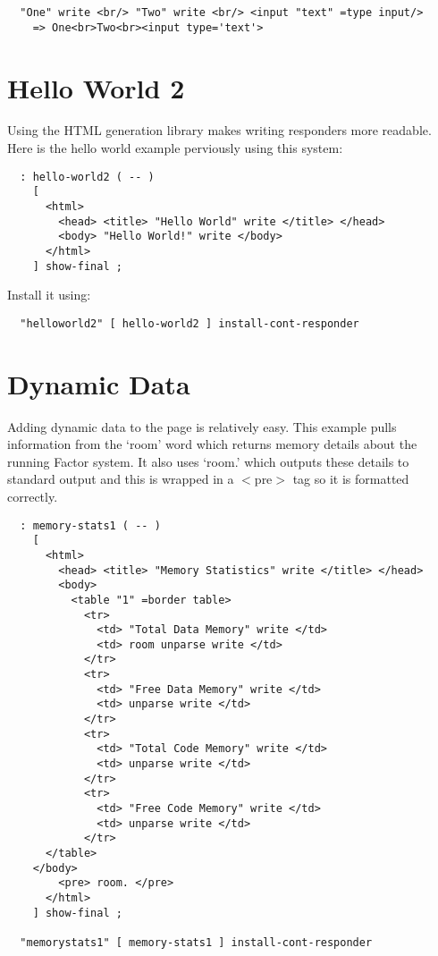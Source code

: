 \begin{verbatim}
  "One" write <br/> "Two" write <br/> <input "text" =type input/>
    => One<br>Two<br><input type='text'>
\end{verbatim}

\section{Hello World 2}


Using the HTML generation library makes writing responders more
readable. Here is the hello world example perviously using this
system:

\begin{verbatim}
  : hello-world2 ( -- )
    [
      <html>
        <head> <title> "Hello World" write </title> </head>
        <body> "Hello World!" write </body>
      </html>
    ] show-final ;
\end{verbatim}

Install it using:

\begin{verbatim}
  "helloworld2" [ hello-world2 ] install-cont-responder
\end{verbatim}

\section{Dynamic Data}

Adding dynamic data to the page is relatively easy. This example pulls
information from the `room' word which returns memory details about
the running Factor system. It also uses `room.' which outputs these
details to standard output and this is wrapped in a $<$pre$>$ tag so it is
formatted correctly.

\begin{verbatim}
  : memory-stats1 ( -- )
    [
      <html>
        <head> <title> "Memory Statistics" write </title> </head>
        <body>
          <table "1" =border table>
            <tr> 
              <td> "Total Data Memory" write </td>
              <td> room unparse write </td>
            </tr>
            <tr> 
              <td> "Free Data Memory" write </td>
              <td> unparse write </td>
            </tr>
            <tr> 
              <td> "Total Code Memory" write </td>
              <td> unparse write </td>
            </tr>
            <tr> 
              <td> "Free Code Memory" write </td>
              <td> unparse write </td>
            </tr>
	  </table>
	</body>
        <pre> room. </pre>
      </html>
    ] show-final ;
    
  "memorystats1" [ memory-stats1 ] install-cont-responder
\end{verbatim}

